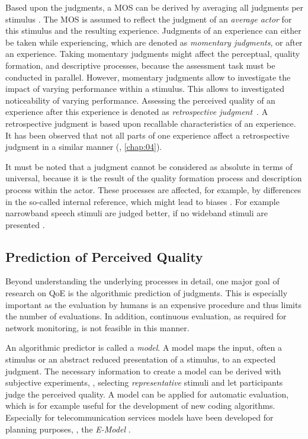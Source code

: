 Based upon the judgments, a \acf{MOS} can be derived by averaging all judgments per stimulus \citep{itu-t_recommendation_p.800.2_mean_2013}.
The \ac{MOS} is assumed to reflect the judgment of an \emph{average actor} for this stimulus and the resulting experience.
Judgments of an experience can either be taken while experiencing, which are denoted as \emph{momentary judgments}, or after an experience.
Taking momentary judgments might affect the perceptual, quality formation, and descriptive processes, because the assessment task must be conducted in parallel. %
However, momentary judgments allow to investigate the impact of varying performance within a stimulus.
This allows to investigated noticeability of varying performance.
Assessing the perceived quality of an experience after this experience is denoted as \emph{retrospective judgment}~\citep[][]{weiss_temporal_2014}.
A retrospective judgment is based upon recallable characteristics of an experience.
It has been observed that not all parts of one experience affect a retrospective judgment in a similar manner (\cf, \autoref{chap:04}).

It must be noted that a judgment cannot be considered as absolute in terms of universal, because it is the result of the quality formation process and description process within the actor.
These processes are affected, for example, by differences in the so-called internal reference, which might lead to biases \citep[][]{zielinski_biases_2008, pitrey_aligning_2011}.
For example narrowband speech stimuli are judged better, if no wideband stimuli are presented \citep[][]{koster_comparison_2015}.

\subsection{Prediction of Perceived Quality}
Beyond understanding the underlying processes in detail, one major goal of research on \ac{QoE} is the algorithmic prediction of judgments.
This is especially important as the evaluation by humans is an expensive procedure and thus limits the number of evaluations.
In addition, continuous evaluation, as required for network monitoring, is not feasible in this manner.

An algorithmic predictor is called a \emph{model}.
A model maps the input, often a stimulus or an abstract reduced presentation of a stimulus, to an expected judgment.
The necessary information to create a model can be derived with subjective experiments, \ie, selecting \emph{representative} stimuli and let participants judge the perceived quality.
A model can be applied for automatic evaluation, which is for example useful for the development of new coding algorithms.
Especially for telecommunication services models have been developed for planning purposes, \eg, the \emph{E-Model} \citep{itu-t_recommendation_g.107_e-model_2015}.

